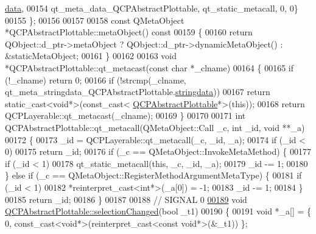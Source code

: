\begin{DoxyCode}
      \hyperlink{a00067_ac951832cc81d6220c552b96fc4354c89}{data},
00154       qt\_meta\_data\_QCPAbstractPlottable,  qt\_static\_metacall, 0, 0\}
00155 \};
00156 
00157 
00158 \textcolor{keyword}{const} QMetaObject *QCPAbstractPlottable::metaObject()\textcolor{keyword}{ const}
00159 \textcolor{keyword}{}\{
00160     \textcolor{keywordflow}{return} QObject::d\_ptr->metaObject ? QObject::d\_ptr->dynamicMetaObject() : &staticMetaObject;
00161 \}
00162 
00163 \textcolor{keywordtype}{void} *QCPAbstractPlottable::qt\_metacast(\textcolor{keyword}{const} \textcolor{keywordtype}{char} *\_clname)
00164 \{
00165     \textcolor{keywordflow}{if} (!\_clname) \textcolor{keywordflow}{return} 0;
00166     \textcolor{keywordflow}{if} (!strcmp(\_clname, qt\_meta\_stringdata\_QCPAbstractPlottable.\hyperlink{a00067_ab78c50bc348c723bab72ef878f28856c}{stringdata}))
00167         \textcolor{keywordflow}{return} \textcolor{keyword}{static\_cast<}\textcolor{keywordtype}{void}*\textcolor{keyword}{>}(\textcolor{keyword}{const\_cast<} \hyperlink{a00024}{QCPAbstractPlottable}*\textcolor{keyword}{>}(\textcolor{keyword}{this}));
00168     \textcolor{keywordflow}{return} QCPLayerable::qt\_metacast(\_clname);
00169 \}
00170 
00171 \textcolor{keywordtype}{int} QCPAbstractPlottable::qt\_metacall(QMetaObject::Call \_c, \textcolor{keywordtype}{int} \_id, \textcolor{keywordtype}{void} **\_a)
00172 \{
00173     \_id = QCPLayerable::qt\_metacall(\_c, \_id, \_a);
00174     \textcolor{keywordflow}{if} (\_id < 0)
00175         \textcolor{keywordflow}{return} \_id;
00176     \textcolor{keywordflow}{if} (\_c == QMetaObject::InvokeMetaMethod) \{
00177         \textcolor{keywordflow}{if} (\_id < 1)
00178             qt\_static\_metacall(\textcolor{keyword}{this}, \_c, \_id, \_a);
00179         \_id -= 1;
00180     \} \textcolor{keywordflow}{else} \textcolor{keywordflow}{if} (\_c == QMetaObject::RegisterMethodArgumentMetaType) \{
00181         \textcolor{keywordflow}{if} (\_id < 1)
00182             *\textcolor{keyword}{reinterpret\_cast<}\textcolor{keywordtype}{int}*\textcolor{keyword}{>}(\_a[0]) = -1;
00183         \_id -= 1;
00184     \}
00185     \textcolor{keywordflow}{return} \_id;
00186 \}
00187 
00188 \textcolor{comment}{// SIGNAL 0}
\hypertarget{a00067_source_l00189}{}\hyperlink{a00024_a3af66432b1dca93b28e00e78a8c7c1d9}{00189} \textcolor{keywordtype}{void} \hyperlink{a00024_a3af66432b1dca93b28e00e78a8c7c1d9}{QCPAbstractPlottable::selectionChanged}(\textcolor{keywordtype}{bool} \_t1)
00190 \{
00191     \textcolor{keywordtype}{void} *\_a[] = \{ 0, \textcolor{keyword}{const\_cast<}\textcolor{keywordtype}{void}*\textcolor{keyword}{>}(\textcolor{keyword}{reinterpret\_cast<}\textcolor{keyword}{const }\textcolor{keywordtype}{void}*\textcolor{keyword}{>}(&\_t1)) \};

\end{DoxyCode}
